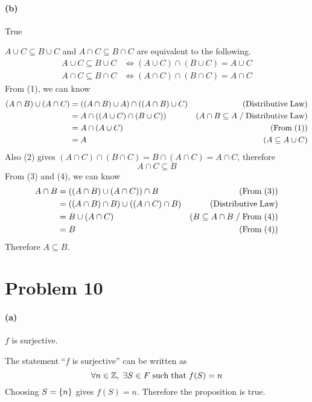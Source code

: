 \documentclass[10pt]{article}
\begin{document}
\paragraph{(b)} True

\vspace{0.3cm} $A\cup C \subseteq B\cup C$ and $A\cap C \subseteq B\cap C$ are equivalent to the following.
\begin{align}
  A\cup C \subseteq B\cup C &\Leftrightarrow (A\cup C) \cap (B\cup C) = A \cup C \\
  A\cap C \subseteq B\cap C &\Leftrightarrow (A\cap C) \cap (B\cap C) = A \cap C
\end{align}
From (1), we can know
\begin{align}
  (A \cap B) \cup (A \cap C) &= \qty((A \cap B) \cup A) \cap \qty((A \cap B) \cup C) &(\rm Distributive \; Law) \nonumber \\
  &= A \cap \qty((A \cup C) \cap (B \cup C)) &(A \cap B \subseteq A \; / \; \rm Distributive \; Law) \nonumber \\
  &= A \cap (A \cup C) &(\rm From \; (1)) \nonumber \\
  &= A &(A \subseteq A \cup C)
\end{align}
Also (2) gives $(A\cap C) \cap (B\cap C) = B \cap (A \cap C) = A \cap C$, therefore 
\begin{equation}
  A \cap C \subseteq B
\end{equation}
From (3) and (4), we can know
\begin{align*}
  A \cap B &= \qty((A \cap B) \cup (A \cap C)) \cap B &(\rm From \; (3))\\
  &= \qty((A \cap B) \cap B) \cup \qty((A \cap C) \cap B) & (\rm Distributive \; Law) \\
  &= B \cup (A \cap C) &(B \subseteq A \cap B \; / \; \rm From \; (4)) \\
  &= B &(\rm From \; (4))
\end{align*}
Therefore $A \subseteq B$. 

\section*{Problem 10}
\paragraph{(a)} $f$ is surjective.

\vspace{0.3cm} The statement ``$f$ is surjective'' can be written as
$$\forall n \in \mathbb{Z}, \; \exists S \in F {\rm \; such \; that \;} f(S) = n$$
Choosing $S = \qty{n}$ gives $f(S) = n$. Therefore the proposition is true.
\end{document}
